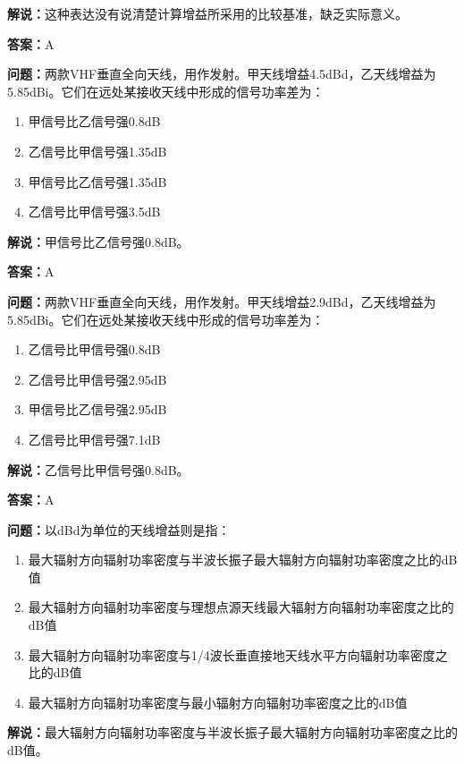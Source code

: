 \documentclass[UTF8]{ctexbook}
\begin{document}
\textbf{解说：}这种表达没有说清楚计算增益所采用的比较基准，缺乏实际意义。%

\textbf{答案：}A

\textbf{问题：}两款VHF垂直全向天线，用作发射。甲天线增益4.5dBd，乙天线增益为5.85dBi。它们在远处某接收天线中形成的信号功率差为：

\begin{enumerate}[label=\Alph*), leftmargin=3em]
  \item 甲信号比乙信号强0.8dB
  \item 乙信号比甲信号强1.35dB
  \item 甲信号比乙信号强1.35dB
  \item 乙信号比甲信号强3.5dB
\end{enumerate}

\textbf{解说：}甲信号比乙信号强0.8dB。%

\textbf{答案：}A

\textbf{问题：}两款VHF垂直全向天线，用作发射。甲天线增益2.9dBd，乙天线增益为5.85dBi。它们在远处某接收天线中形成的信号功率差为：

\begin{enumerate}[label=\Alph*), leftmargin=3em]
  \item 乙信号比甲信号强0.8dB
  \item 乙信号比甲信号强2.95dB
  \item 甲信号比乙信号强2.95dB
  \item 乙信号比甲信号强7.1dB
\end{enumerate}

\textbf{解说：}乙信号比甲信号强0.8dB。%

\textbf{答案：}A

\textbf{问题：}以dBd为单位的天线增益则是指：

\begin{enumerate}[label=\Alph*), leftmargin=3em]
  \item 最大辐射方向辐射功率密度与半波长振子最大辐射方向辐射功率密度之比的dB值
  \item 最大辐射方向辐射功率密度与理想点源天线最大辐射方向辐射功率密度之比的dB值
  \item 最大辐射方向辐射功率密度与1/4波长垂直接地天线水平方向辐射功率密度之比的dB值
  \item 最大辐射方向辐射功率密度与最小辐射方向辐射功率密度之比的dB值
\end{enumerate}

\textbf{解说：}最大辐射方向辐射功率密度与半波长振子最大辐射方向辐射功率密度之比的dB值。%
\end{document}
